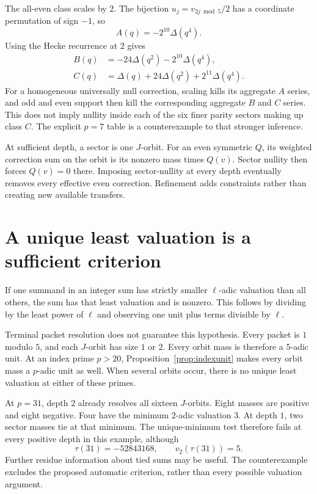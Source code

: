 The all-even class scales by $2$. The bijection $u_j=v_{2j\bmod5}/2$ has a coordinate permutation of sign $-1$, so
\[
A(q)=-2^{10}\Delta(q^4).
\]
Using the Hecke recurrence at $2$ gives
\begin{align}
B(q)&=-24\Delta(q^2)-2^{10}\Delta(q^4),\\
C(q)&=\Delta(q)+24\Delta(q^2)+2^{11}\Delta(q^4).
\end{align}
For a homogeneous universally null correction, scaling kills its aggregate $A$ series, and odd and even support then kill the corresponding aggregate $B$ and $C$ series. This does not imply nullity inside each of the six finer parity sectors making up class $C$. The explicit $p=7$ table is a counterexample to that stronger inference.

At sufficient depth, a sector is one $J$-orbit. For an even symmetric $Q$, its weighted correction sum on the orbit is its nonzero mass times $Q(v)$. Sector nullity then forces $Q(v)=0$ there. Imposing sector-nullity at every depth eventually removes every effective even correction. Refinement adds constraints rather than creating new available transfers.

\section{A unique least valuation is a sufficient criterion}
If one summand in an integer sum has strictly smaller $\ell$-adic valuation than all others, the sum has that least valuation and is nonzero. This follows by dividing by the least power of $\ell$ and observing one unit plus terms divisible by $\ell$.

Terminal packet resolution does not guarantee this hypothesis. Every packet is $1$ modulo $5$, and each $J$-orbit has size $1$ or $2$. Every orbit mass is therefore a $5$-adic unit. At an index prime $p>20$, Proposition~\ref{prop:indexunit} makes every orbit mass a $p$-adic unit as well. When several orbits occur, there is no unique least valuation at either of these primes.

At $p=31$, depth $2$ already resolves all sixteen $J$-orbits. Eight masses are positive and eight negative. Four have the minimum $2$-adic valuation $3$. At depth $1$, two sector masses tie at that minimum. The unique-minimum test therefore fails at every positive depth in this example, although
\[
\tau(31)=-52843168,\qquad v_2(\tau(31))=5.
\]
Further residue information about tied sums may be useful. The counterexample excludes the proposed automatic criterion, rather than every possible valuation argument.


